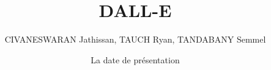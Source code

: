 \documentclass[aspectratio=169]{beamer}
\title{DALL-E}
\author{CIVANESWARAN Jathissan, TAUCH Ryan, TANDABANY Semmel}
\institute{JRS}
\date{La date de présentation}
\begin{document}

\begin{frame}
  \titlepage
\end{frame}

\end{document}
